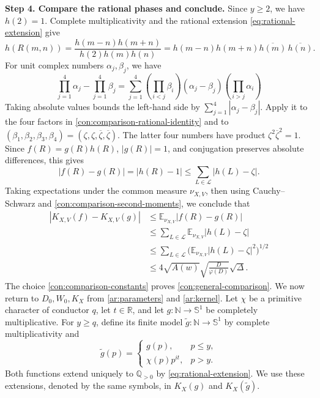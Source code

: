 \documentclass[twoside]{aomart}
\makeatletter
\theoremstyle{paperplain}
\theoremstyle{paperdefinition}
\renewenvironment{proof}[1][\proofname]{\par\pushQED{\qed}%
  \normalfont\topsep6\p@\@plus3\p@\relax\trivlist
  \item[\hskip\labelsep\itshape #1\@addpunct{.}]\ignorespaces
}{\popQED\endtrivlist\@endpefalse}
\newcommand{\E}{\mathbb E}
\newcommand{\N}{\mathbb N}
\newcommand{\Q}{\mathbb Q}
\newcommand{\R}{\mathbb R}
\numberwithin{equation}{section}
\makeatother
\begin{document}
\begin{proof}
\medskip
\noindent\textbf{Step 4. Compare the rational phases and conclude.}
Since $y\ge2$, we have $h(2)=1$.
Complete multiplicativity and the rational extension
\eqref{eq:rational-extension} give
\begin{equation}
 h(R(m,n))=\frac{h(m-n)h(m+n)}{h(2)h(m)h(n)}
 =h(m-n)h(m+n)\overline{h(m)}\,\overline{h(n)}.
 \label{con:comparison-rational-identity}
\end{equation}
For unit complex numbers $\alpha_j,\beta_j$, we have
\begin{equation*}
 \prod_{j=1}^4\alpha_j-\prod_{j=1}^4\beta_j
 =\sum_{j=1}^4
   \left(\prod_{i<j}\beta_i\right)(\alpha_j-\beta_j)
   \left(\prod_{i>j}\alpha_i\right)
 \end{equation*}
Taking absolute values bounds the left-hand side by
$\sum_{j=1}^4|\alpha_j-\beta_j|$.
Apply it to the four factors in \eqref{con:comparison-rational-identity}
and to $(\beta_1,\beta_2,\beta_3,\beta_4)
=(\zeta,\zeta,\overline\zeta,\overline\zeta)$.
The latter four numbers have product $\zeta^2\overline\zeta^2=1$.
Since $f(R)=g(R)h(R)$, $|g(R)|=1$, and conjugation preserves
absolute differences, this gives
\begin{equation*}
 |f(R)-g(R)|=|h(R)-1|
 \le\sum_{L\in\mathcal L}|h(L)-\zeta|.
 \end{equation*}
Taking expectations under the common measure $\nu_{X,V}$,
then using Cauchy--Schwarz and \eqref{con:comparison-second-moments},
we conclude that
\begin{equation*}
 \begin{aligned}
 |K_{X,V}(f)-K_{X,V}(g)|
 &\le\E_{\nu_{X,V}}|f(R)-g(R)|\\
 &\le\sum_{L\in\mathcal L}\E_{\nu_{X,V}}|h(L)-\zeta|\\
 &\le\sum_{L\in\mathcal L}
        \bigl(\E_{\nu_{X,V}}|h(L)-\zeta|^2\bigr)^{1/2}\\
 &\le4\sqrt{A(w)}\sqrt{\frac D{\varphi(D)}}\sqrt\Delta.
 \end{aligned}
 \end{equation*}
The choice \eqref{con:comparison-constants} proves
\eqref{con:general-comparison}.
\end{proof}
We now return to $D_0,W_0,K_X$ from \eqref{ar:parameters}
and \eqref{ar:kernel}. Let $\chi$ be a primitive character of
conductor $q$, let $t\in\R$, and let
$g:\N\to\mathbb S^1$ be completely multiplicative.
For $y\ge q$, define its finite model
$\widetilde g:\N\to\mathbb S^1$ by complete multiplicativity and
\begin{equation*}
 \widetilde g(p)=
 \begin{cases}g(p),&p\le y,\\ \chi(p)p^{it},&p>y.
 \end{cases}
\end{equation*}
Both functions extend uniquely to $\Q_{>0}$ by
\eqref{eq:rational-extension}. We use these extensions, denoted
by the same symbols, in $K_X(g)$ and $K_X(\widetilde g)$.
\end{document}
